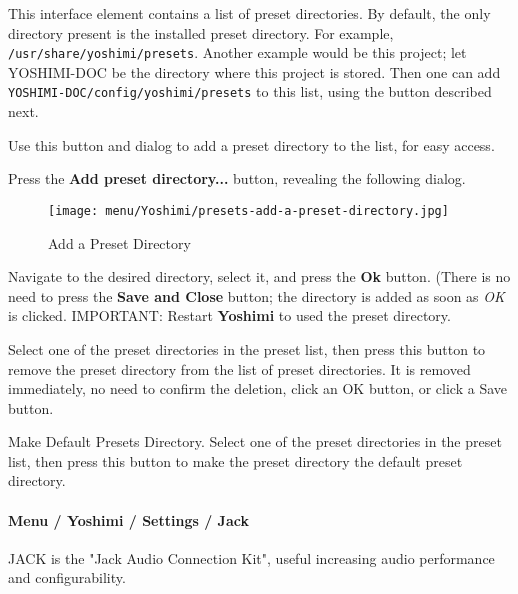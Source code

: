    \setcounter{ItemCounter}{0}      %

   This interface element contains a list of preset directories.
   By default, the only directory present is the installed preset directory.
   For example, \texttt{/usr/share/yoshimi/presets}.
   Another example would be this project; let YOSHIMI-DOC be the directory
   where this project is stored.  Then one can add
   \texttt{YOSHIMI-DOC/config/yoshimi/presets} to this list, using the
   button described next.

   Use this button and dialog to add a preset directory to the list, for
   easy access.

   Press the \textbf{Add preset directory...} button, revealing the
   following dialog.

\begin{figure}[H]
   \centering 
   \texttt{[image: menu/Yoshimi/presets-add-a-preset-directory.jpg]}
   \caption[Add Preset Directory]{Add a Preset Directory}
   \label{fig:presets_add_a_preset_directory}
\end{figure}

   Navigate to the desired directory, select it, and press the \textbf{Ok}
   button.  (There is no need to press the \textbf{Save and Close} button;
   the directory is added as soon as \textsl{OK} is clicked.
   IMPORTANT:  Restart \textbf{Yoshimi} to used the preset directory.

   Select one of the preset directories in the preset list, then press this
   button to remove the preset directory from the list of preset
   directories.  It is removed immediately, no need to confirm the deletion,
   click an OK button, or click a Save button.

   Make Default Presets Directory.
   Select one of the preset directories in the preset list, then press this
   button to make the preset directory the default preset directory.

\paragraph{Menu / Yoshimi / Settings / Jack}
\label{paragraph:menu_yoshimi_settings_jack}

   JACK is the "Jack Audio Connection Kit", useful increasing audio
   performance and configurability.

